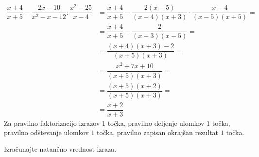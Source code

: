 \documentclass[addpoints]{exam}
\begin{document}
\begin{questions}
\begin{parts}
            \begin{solution}[4cm]
                \begin{align*}
                    \dfrac{x+4}{x+5}-\dfrac{2x-10}{x^2-x-12}:\dfrac{x^2-25}{x-4} &= \dfrac{x+4}{x+5}-\dfrac{2(x-5)}{(x-4)(x+3)}\cdot\dfrac{x-4}{(x-5)(x+5)}= \\
                                                                                &= \dfrac{x+4}{x+5}-\dfrac{2}{(x+3)(x-5)}= \\
                                                                                &= \dfrac{(x+4)(x+3)-2}{(x+5)(x+3)}= \\
                                                                                &= \dfrac{x^2+7x+10}{(x+5)(x+3)}= \\
                                                                                &= \dfrac{(x+5)(x+2)}{(x+5)(x+3)}= \\
                                                                                &=\dfrac{x+2}{x+3}
                \end{align*}
                Za pravilno faktorizacijo izrazov $1$ točka, pravilno deljenje ulomkov $1$ točka, pravilno odštevanje ulomkov $1$ točka, pravilno zapisan okrajšan rezultat $1$ točka.
            \end{solution}

    
    
        \end{parts}
   
   
   
   
        \newpage


            \question
    Izračunajte natančno vrednost izraza.
\end{questions}
\end{document}
